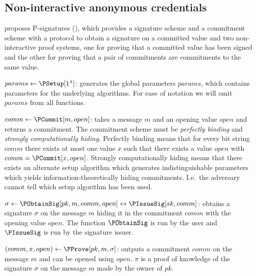 \subsection{Non-interactive anonymous credentials}%
\label{NIZK-proofs}


 proposes P-signatures (\Psig), which provides a signature 
scheme and a commitment scheme with a protocol to obtain a signature on a 
committed value and two non-interactive proof systems, one for proving that a 
committed value has been signed and the other for proving that a pair of 
commitments are commitments to the same value.


\(params\gets \PSetup[1^\lambda]\): generates the global parameters \(params\), 
which contains parameters for the underlying algorithms.
For ease of notation we will omit \(params\) from all functions.


\(comm\gets \PCommit[m, open]\): takes a message \(m\) and an opening value 
\(open\) and returns a commitment.
The commitment scheme must be \emph{perfectly binding} and \emph{strongly 
  computationally hiding}.
Perfectly binding means that for every bit string \(comm\) there exists at most 
one value \(x\) such that there exists a value \(open\) with \(comm = 
  \PCommit[x, open]\).
Strongly computationally hiding means that there exists an alternate setup 
algorithm which generates indistinguishable parameters which yields 
information-theoretically hiding commitments.
I.e.\ the adversary cannot tell which setup algorithm has been used.


\(\sigma\gets \PObtainSig[pk, m, comm, open]\leftrightarrow
  \PIssueSig[sk, comm]\): obtains a signature \(\sigma\) on the message 
\(m\) hiding it in the commitment \(comm\) with the opening value \(open\).
The function \(\PObtainSig\) is run by the user and \(\PIssueSig\) is run by the 
signature issuer.


\((comm, \pi, open)\gets \PProve[pk, m, \sigma]\): outputs a commitment 
\(comm\) on the message \(m\) and can be opened using \(open\).
\(\pi\) is a proof of knowledge of the signature \(\sigma\) on the message \(m\) 
made by the owner of \(pk\).

